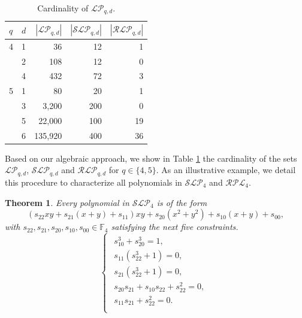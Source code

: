 \documentclass[pdflatex,sn-mathphys-num]{sn-jnl}
\theoremstyle{thmstyleone}%
\newtheorem{theorem}{Theorem}[section]
\begin{document}
\begin{table}[ht]
\caption{Cardinality of $\mathcal{LP}_{q,d}$.}\label{table_LPqd}%
\begin{tabular}{llrrr}
$q$ & $d$  & $|\mathcal{LP}_{q,d}|$ & $|\mathcal{SLP}_{q,d}|$ & $|\mathcal{RLP}_{q,d}|$\\
\midrule
4 & 1 & 36 & 12 & 1\\
  & 2 & 108 & 12 & 0\\
  & 4 & 432 & 72 & 3\\
5 & 1 & 80 & 20 & 1\\
  & 3 & 3,200 & 200 & 0\\
  & 5 & 22,000 & 100 & 19\\
  & 6 & 135,920 & 400 & 36\\
\end{tabular}
\end{table}

Based on our algebraic approach, we show in Table \ref{table_LPqd} the cardinality of the sets $\mathcal{LP}_{q,d}$, $\mathcal{SLP}_{q,d}$  and $\mathcal{RLP}_{q,d}$  for $q\in \{4,5\}$. As an illustrative example, we detail this procedure to characterize all polynomials in $\mathcal{SLP}_4$ and $\mathcal{RPL}_4$. 

\begin{theorem}\label{theorem_SLP4} Every polynomial in $\mathcal{SLP}_4$ is of the form
\[(s_{22}xy +s_{21}(x+y)+ s_{11})xy+s_{20}(x^2+y^2)+s_{10}(x+y)+s_{00},\]
with $s_{22},s_{21},s_{20},s_{10},s_{00}\in\mathbb{F}_4$ satisfying the next five constraints.
\[\begin{cases}\begin{array}{r}
s_{10}^3+s_{20}^3=1,\\
s_{11}(s_{22}^3+1)=0,\\
s_{21}(s_{22}^3+1)=0,\\
s_{20}s_{21}+s_{10}s_{22}+s_{22}^2=0,\\
s_{11}s_{21}+s_{22}^2=0.\\
\end{array}
\end{cases}\]
\end{theorem}
\end{document}
